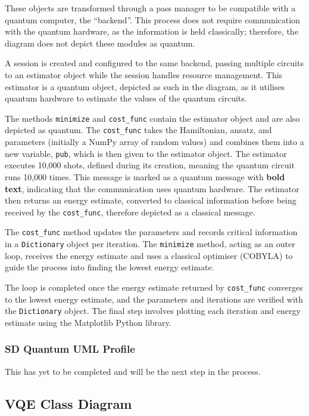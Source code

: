\documentclass{article}
\begin{document}
These objects are transformed through a pass manager to be compatible with a quantum computer, the “backend”. This process does not require communication with the quantum hardware, as the information is held classically; therefore, the diagram does not depict these modules as quantum.

A session is created and configured to the same backend, passing multiple circuits to an estimator object while the session handles resource management. This estimator is a quantum object, depicted as such in the diagram, as it utilises quantum hardware to estimate the values of the quantum circuits. 

The methods \texttt{minimize} and \texttt{cost\_func} contain the estimator object and are also depicted as quantum. The \texttt{cost\_func} takes the Hamiltonian, ansatz, and parameters (initially a NumPy array of random values) and combines them into a new variable, \texttt{pub}, which is then given to the estimator object. The estimator executes 10,000 shots, defined during its creation, meaning the quantum circuit runs 10,000 times. This message is marked as a quantum message with \textbf{bold text}, indicating that the communication uses quantum hardware. The estimator then returns an energy estimate, converted to classical information before being received by the \texttt{cost\_func}, therefore depicted as a classical message.

The \texttt{cost\_func} method updates the parameters and records critical information in a \texttt{Dictionary} object per iteration. The \texttt{minimize} method, acting as an outer loop, receives the energy estimate and uses a classical optimiser (COBYLA) to guide the process into finding the lowest energy estimate.

The loop is completed once the energy estimate returned by \texttt{cost\_func} converges to the lowest energy estimate, and the parameters and iterations are verified with the \texttt{Dictionary} object. The final step involves plotting each iteration and energy estimate using the Matplotlib Python library.

\subsubsection{SD Quantum UML Profile}

This has yet to be completed and will be the next step in the process.

\subsection{VQE Class Diagram}
\end{document}

